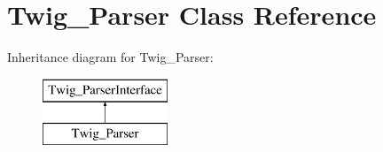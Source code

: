 \hypertarget{class_twig___parser}{}\section{Twig\+\_\+\+Parser Class Reference}
\label{class_twig___parser}
Inheritance diagram for Twig\+\_\+\+Parser\+:\begin{figure}[H]
\begin{center}
\leavevmode
\includegraphics[height=2.000000cm]{class_twig___parser}
\end{center}
\end{figure}
